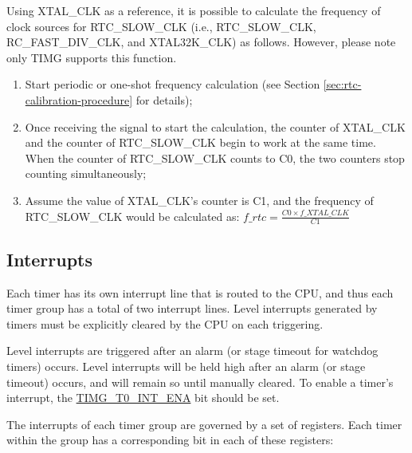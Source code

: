 \documentclass[main\_\_EN.tex]{subfiles}
\begin{document}
Using XTAL\_CLK as a reference, it is possible to calculate the frequency of clock sources for RTC\_SLOW\_CLK (i.e., RTC\_SLOW\_CLK, RC\_FAST\_DIV\_CLK, and XTAL32K\_CLK) as follows. However, please note only TIMG supports this function.

\begin{enumerate}
    \item Start periodic or one-shot frequency calculation (see Section \ref{sec:rtc-calibration-procedure} for details);
    \item Once receiving the signal to start the calculation, the counter of XTAL\_CLK and the counter of RTC\_SLOW\_CLK begin to work at the same time. When the counter of RTC\_SLOW\_CLK counts to C0, the two counters stop counting simultaneously;
    \item Assume the value of XTAL\_CLK's counter is C1, and the frequency of RTC\_SLOW\_CLK would be calculated as:
    $f\_rtc = \frac{C0 \times f\_XTAL\_CLK}{C1}$
\end{enumerate}

\subsection{Interrupts}\label{sec:timg-interrupt}

Each timer has its own interrupt line that is routed to the CPU, and thus each timer group has a total of two interrupt lines. Level interrupts generated by timers must be explicitly cleared by the CPU on each triggering.

Level interrupts are triggered after an alarm (or stage timeout for watchdog timers) occurs. Level interrupts will be held high after an alarm (or stage timeout) occurs, and will remain so until manually cleared. To enable a timer's interrupt, the \hyperref[fielddesc:TIMGT0INTENA]{TIMG\_T0\_INT\_ENA} bit should be set.

The interrupts of each timer group are governed by a set of registers. Each timer within the group has a corresponding bit in each of these registers:
\end{document}
